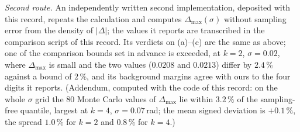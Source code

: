 \documentclass[aps,pra,reprint,superscriptaddress,nofootinbib]{revtex4-2}
\begin{document}
\emph{Second route.} An independently written second implementation, deposited with this record, repeats the calculation and computes $\Delta_{\max}(\sigma)$ without sampling error from the density of $|\Delta|$; the values it reports are transcribed in the comparison script of this record. Its verdicts on (a)--(c) are the same as above; one of the comparison bounds set in advance is exceeded, at $k=2$, $\sigma=0.02$, where $\Delta_{\max}$ is small and the two values ($0.0208$ and $0.0213$) differ by $2.4\,\%$ against a bound of $2\,\%$, and its background margins agree with ours to the four digits it reports. (Addendum, computed with the code of this record: on the whole $\sigma$ grid the 80 Monte Carlo values of $\Delta_{\max}$ lie within $3.2\,\%$ of the sampling-free quantile, largest at $k=4$, $\sigma=0.07$\,rad; the mean signed deviation is $+0.1\,\%$, the spread $1.0\,\%$ for $k=2$ and $0.8\,\%$ for $k=4$.)
\end{document}
